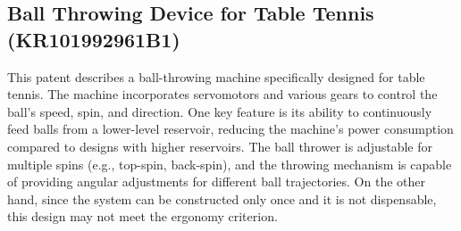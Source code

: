 \documentclass[12pt]{article}
\begin{document}
\subsection{Ball Throwing Device for Table Tennis (KR101992961B1) \cite{Kang2019}}

\begin{minipage}{0.6\textwidth}  %
    This patent describes a ball-throwing machine specifically designed for table tennis. The machine incorporates servomotors and various gears to control the ball's speed, spin, and direction. One key feature is its ability to continuously feed balls from a lower-level reservoir, reducing the machine's power consumption compared to designs with higher reservoirs. The ball thrower is adjustable for multiple spins (e.g., top-spin, back-spin), and the throwing mechanism is capable of providing angular adjustments for different ball trajectories. On the other hand, since the system can be constructed only once and it is not dispensable, this design may not meet the ergonomy criterion. 
\end{minipage}%
\hfill
\end{document}
